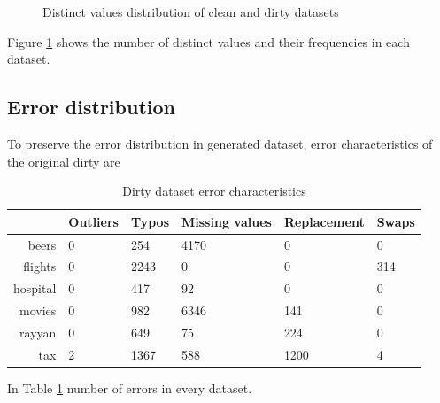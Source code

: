 \begin{figure}[!t]
\caption{Distinct values distribution of clean and dirty datasets}
\label{exp:distinct_values_datasets}
\end{figure}
Figure \ref{exp:distinct_values_datasets} shows the number of distinct values and their frequencies in each dataset. 

\subsection{Error distribution}
To preserve the error distribution in generated dataset, error characteristics of the original dirty are %
\begin{table}[!t]
\caption{\label{tab:dirty_num_errors}Dirty dataset error characteristics}
\begin{tabular}{r|l|l|l|l|l}
\toprule
                     & Outliers & Typos & Missing values & Replacement & Swaps \\ \midrule
beers                & 0        & 254   & 4170           & 0                & 0       \\
flights              & 0        & 2243  & 0              & 0                & 314     \\
hospital             & 0        & 417   & 92             & 0                & 0       \\
movies               & 0        & 982   & 6346           & 141              & 0       \\
rayyan               & 0        & 649   & 75             & 224              & 0       \\
tax                  & 2        & 1367  & 588            & 1200             & 4       \\ \bottomrule
\end{tabular}
\end{table}
In Table \ref{tab:dirty_num_errors} number of errors in every dataset.

